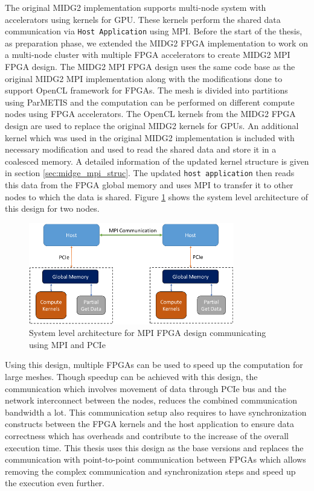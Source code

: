 The original MIDG2 implementation supports multi-node system with accelerators using
kernels for GPU. These kernels perform the shared data communication via \texttt{Host Application}
using MPI. Before the start of the thesis, as preparation phase, we extended the MIDG2 FPGA
implementation to work on a multi-node cluster with multiple FPGA accelerators to create MIDG2 MPI FPGA design.
The MIDG2 \ac{MPI} FPGA design uses the same code base as the original MIDG2 \ac{MPI} implementation
along with the modifications done to support OpenCL framework for FPGAs.
The mesh is divided into partitions using ParMETIS and the computation can be performed on different
compute nodes using FPGA accelerators. The OpenCL kernels from the MIDG2 FPGA design are used to replace
the original MIDG2 kernels for GPUs. An additional kernel which was used in the original MIDG2
implementation is included with necessary modification and used to read the shared data and store it in a coalesced
memory. A detailed information of the updated kernel structure is given in section \ref{sec:midge_mpi_struc}.
The updated \texttt{host application} then reads this data from the FPGA global memory and uses
\ac{MPI} to transfer it to other nodes to which the data is shared. Figure
\ref{fig:mpi_fpga} shows the system level architecture of this design for two nodes.
\begin{figure}[ht]%
    \centering
    \includegraphics[width=0.8\textwidth]{images/mpi_fpga}
    \caption{System level architecture for MPI FPGA design communicating using MPI and PCIe}
    \label{fig:mpi_fpga}
\end{figure}

Using this design, multiple FPGAs can be used to speed up the computation for large meshes.
Though speedup can be achieved with this design, the communication which involves
movement of data through PCIe bus and the network interconnect between the nodes,
reduces the combined communication bandwidth a lot. This communication setup also
requires to have synchronization constructs between the FPGA kernels and the host
application to ensure data correctness which has overheads and contribute to the increase
of the overall execution time. This thesis uses this design as the base versions and replaces
the communication with point-to-point communication between FPGAs which allows
removing the complex communication and synchronization steps and speed up the
execution even further.

